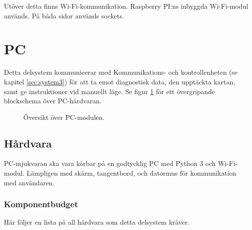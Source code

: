 \documentclass[a4paper,11pt]{article}
\begin{document}
Utöver detta finns Wi-Fi-kommunikation. Raspberry PI:ns inbyggda Wi-Fi-modul används. På båda sidor används sockets.

\newpage
\section{PC} \label{sec:system4}
Detta delsystem kommunicerar med Kommunikations- och kontrollenheten (se kapitel \ref{sec:system3}) för att ta emot diagnostisk data, den upptäckta kartan, samt ge instruktioner vid manuellt läge. Se figur \ref{fig:unitPC} för ett övergripande blockschema över PC-hårdvaran.

\begin{figure}[h!]
    \caption{Översikt över PC-modulen.}
    \label{fig:unitPC}
\end{figure}
\subsection{Hårdvara}
PC-mjukvaran ska vara körbar på en godtycklig PC med Python 3 och Wi-Fi-modul. Lämpligen med skärm, tangentbord, och datormus för kommunikation med användaren.

\subsubsection{Komponentbudget}
Här följer en lista på all hårdvara som detta delsystem kräver.

\begin{center}
\begin{HardwareList}
\end{HardwareList}
\end{center}
\end{document}
